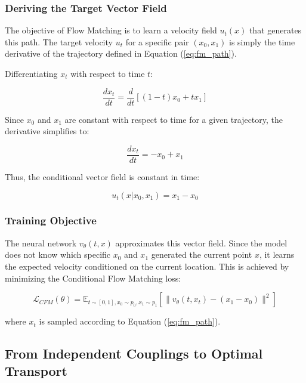\documentclass{book}
\begin{document}
\subsubsection*{Deriving the Target Vector Field}
The objective of Flow Matching is to learn a velocity field $u_t(x)$ that generates this path. The target velocity $u_t$ for a specific pair $(x_0, x_1)$ is simply the time derivative of the trajectory defined in Equation (\ref{eq:fm_path}).

Differentiating $x_t$ with respect to time $t$:

\begin{equation} \label{eq:time_derivative}
\frac{dx_t}{dt} = \frac{d}{dt} \left[ (1 - t) x_0 + t x_1 \right]
\end{equation}

Since $x_0$ and $x_1$ are constant with respect to time for a given trajectory, the derivative simplifies to:

\begin{equation}
\frac{dx_t}{dt} = -x_0 + x_1
\end{equation}

Thus, the conditional vector field is constant in time:

\begin{equation} \label{eq:fm_velocity}
u_t(x|x_0, x_1) = x_1 - x_0
\end{equation}

\subsubsection*{Training Objective}
The neural network $v_\theta(t, x)$ approximates this vector field. Since the model does not know which specific $x_0$ and $x_1$ generated the current point $x$, it learns the expected velocity conditioned on the current location. This is achieved by minimizing the Conditional Flow Matching loss:

\begin{equation}
\mathcal{L}_{CFM}(\theta) = \mathbb{E}_{t \sim [0,1], x_0 \sim p_0, x_1 \sim p_1} \left[ \| v_\theta(t, x_t) - (x_1 - x_0) \|^2 \right]
\end{equation}

where $x_t$ is sampled according to Equation (\ref{eq:fm_path}).

\subsection{From Independent Couplings to Optimal Transport}
\end{document}
